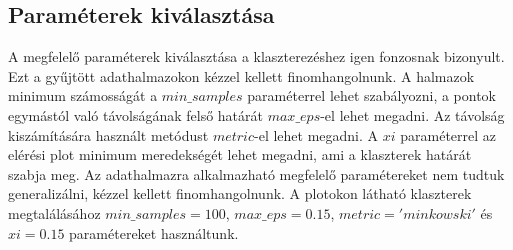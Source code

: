 \documentclass[12pt,a4paper]{article}
\begin{document}
\subsection{Paraméterek kiválasztása}
A megfelelő paraméterek kiválasztása a klaszterezéshez igen fonzosnak bizonyult. Ezt a gyűjtött adathalmazokon kézzel kellett finomhangolnunk.
A halmazok minimum számosságát a \begin{math}min\_samples\end{math} paraméterrel lehet szabályozni, a pontok egymástól való távolságának
felső határát \begin{math}max\_eps\end{math}-el lehet megadni. Az távolság kiszámítására használt metódust \begin{math}metric\end{math}-el
lehet megadni. A \begin{math}xi\end{math} paraméterrel az elérési plot minimum meredekségét lehet megadni, ami a klaszterek határát szabja meg.
Az adathalmazra alkalmazható megfelelő paramétereket nem tudtuk generalizálni, kézzel kellett finomhangolnunk. A plotokon látható klaszterek
megtalálásához \begin{math}min\_samples=100\end{math}, \begin{math}max\_eps=0.15\end{math}, \begin{math}metric='minkowski'\end{math} és \begin{math}xi=0.15\end{math}
paramétereket használtunk.

\newpage
\end{document}
